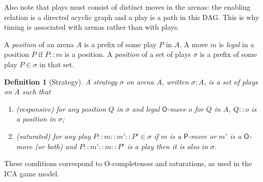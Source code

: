 \documentclass{article}
\newtheorem{definition}[theorem]{Definition}
\newcommand{\mv}[1]{\mathsf{#1}}
\begin{document}
Also note that plays must consist of distinct moves in the arenas: the enabling relation is a directed acyclic graph and a play is a path in this DAG. This is why timing is associated with arenas rather than with plays.  

A \emph{position} of an arena $A$ is a prefix of some play $P$ in $A$. A move $m$ is \emph{legal} in a position $P$ if $P::m$ is a position. A \emph{position} of a set of plays $\sigma$ is a prefix of some play $P\in\sigma$ in that set. 
\begin{definition}[Strategy]\label{def:strat}
A \emph{strategy} $\sigma$ on arena $A$, written $\sigma:A$, is a set of plays on $A$ such that 
\begin{enumerate}
\item (responsive) for any position $Q$ in $\sigma$ and legal $\mv O$-move $o$ for $Q$ in $A$, $Q::o$ is a position in $\sigma$;
\item (saturated) for any play $P::m::m'::P'\in\sigma$ if $m$ is a $\mv P$-move or $m'$ is a $\mv O$-move (or both) and $P::m'::m::P'$ is a play then it is also in $\sigma$.
\end{enumerate}
\end{definition}
These conditions correspond to O-completeness and saturations, as used in the ICA game model. 
\end{document}

